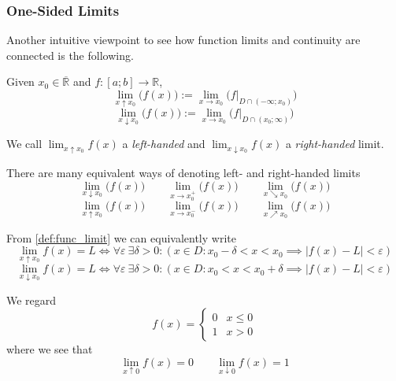 \subsubsection{One-Sided Limits}
Another intuitive viewpoint to see how function limits and continuity are connected is the following.
\begin{definition}\label{def:one-sided_limit}
   Given \(x_0 \in \overline{\mathbb{R}}\) and \(f: [a;b] \to \mathbb{R}\),
   \[\lim_{x \uparrow x_0}\big(f(x)\big) := \lim_{x \to x_0}\big(f|_{D \cap (-\infty; x_0)}\big)\]
   \[\lim_{x \downarrow x_0}\big(f(x)\big) := \lim_{x \to x_0}\big(f|_{D \cap (x_0; \infty)}\big)\]
\end{definition}
\begin{remark}[Terminology]
   We call \(\lim_{x \uparrow x_0} f(x)\) a \emph{left-handed} and \(\lim_{x \downarrow x_0} f(x)\) a \emph{right-handed} limit.
\end{remark}
\begin{remark}[Notation]
   There are many equivalent ways of denoting left- and right-handed limits
   \[\lim_{x \downarrow x_0}\big(f(x)\big) \qquad \lim_{x \to x_0^+}\big(f(x)\big) \qquad \lim_{x \searrow x_0}\big(f(x)\big)\]
   \[\lim_{x \uparrow x_0}\big(f(x)\big) \qquad \lim_{x \to x_0^-}\big(f(x)\big) \qquad \lim_{x \nearrow x_0}\big(f(x)\big)\]
\end{remark}
\begin{remark}
   From \cref{def:func_limit} we can equivalently write
   \[\lim_{x \uparrow x_0} f(x) = L \iff \forall \varepsilon~\exists \delta > 0: (x \in D: x_0- \delta < x < x_0 \implies |f(x) - L| < \varepsilon)\]
   \[\lim_{x \downarrow x_0} f(x) = L \iff \forall \varepsilon~\exists \delta > 0: (x \in D: x_0 < x < x_0 + \delta \implies |f(x) - L| < \varepsilon)\]
\end{remark}
\begin{example}
   We regard
   \[f(x) = \begin{cases}0 & x \leq 0\\ 1 & x > 0\end{cases}\]
   where we see that
   \[\lim_{x \uparrow 0} f(x) = 0 \qquad \lim_{x \downarrow 0} f(x) = 1\]
\end{example}
\begin{center}
   
\end{center}

